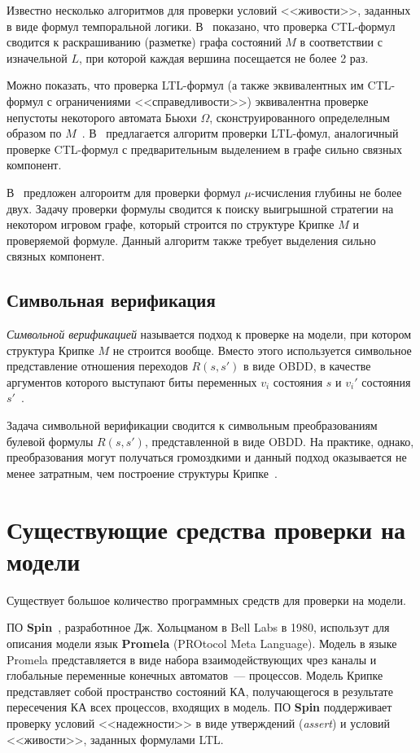 \documentclass[a4paper,notitlepage,14pt]{article}
\begin{document}
Известно несколько алгоритмов для проверки условий <<живости>>, заданных в виде формул
темпоральной логики. В~\cite{Bhat95efficienton-the-fly} показано, что проверка CTL-формул
сводится к раскрашиванию (разметке) графа состояний $M$ в соответствии с изначельной $L$,
при которой каждая вершина посещается не более 2 раз.

Можно показать, что проверка LTL-формул (а также эквивалентных им CTL-формул с
ограничениями <<справедливости>>) эквивалентна проверке непустоты некоторого автомата
Бьюхи $\Omega$, сконструированного определелным образом по
$M$~\cite{Katoen}. В~\cite{Clarke97anotherlook} предлагается алгоритм проверки LTL-фомул,
аналогичный проверке CTL-формул с предварительным выделением в графе сильно связных
компонент.

В~\cite{Bollig_localparallel,Leucker_parallelmodel} предложен алгороитм для проверки
формул $\mu$-исчисления глубины не более двух. Задачу проверки формулы сводится к поиску
выигрышной стратегии на некотором игровом графе, который строится по структуре Крипке $M$
и проверяемой формуле. Данный алгоритм также требует выделения сильно связных компонент.

\subsection{Символьная верификация}
\label{sec:symbolic}

\emph{Символьной верификацией} называется подход к проверке на модели, при котором
структура Крипке $M$ не строится вообще. Вместо этого используется символьное
представление отношения переходов $R(s, s')$ в виде OBDD, в качестве аргументов которого
выступают биты переменных $v_i$ состояния $s$ и $v_i'$ состояния $s'$~\cite{Clarke}.

Задача символьной верификации сводится к символьным преобразованиям булевой формулы $R(s,
s')$, представленной в виде OBDD. На практике, однако, преобразования могут получаться
громоздкими и данный подход оказывается не менее затратным, чем построение структуры
Крипке~\cite{Stern97parallelizingthe}.

\section{Существующие средства проверки на модели}
\label{sec:existing-tools}

Существует большое количество программных средств для проверки на модели. 

ПО \textbf{Spin}~\cite{SpinRoot}, разработнное Дж. Хольцманом в Bell Labs в 1980,
использут для описания модели язык \textbf{Promela} (PROtocol Meta Language). Модель в
языке Promela представляется в виде набора взаимодействующих чрез каналы и глобальные
переменные конечных автоматов~--- процессов. Модель Крипке представляет собой пространство
состояний КА, получающегося в результате пересечения КА всех процессов, входящих в
модель. ПО \textbf{Spin} поддерживает проверку условий <<надежности>> в виде утверждений
(\emph{assert}) и условий <<живости>>, заданных формулами LTL.
\end{document}
